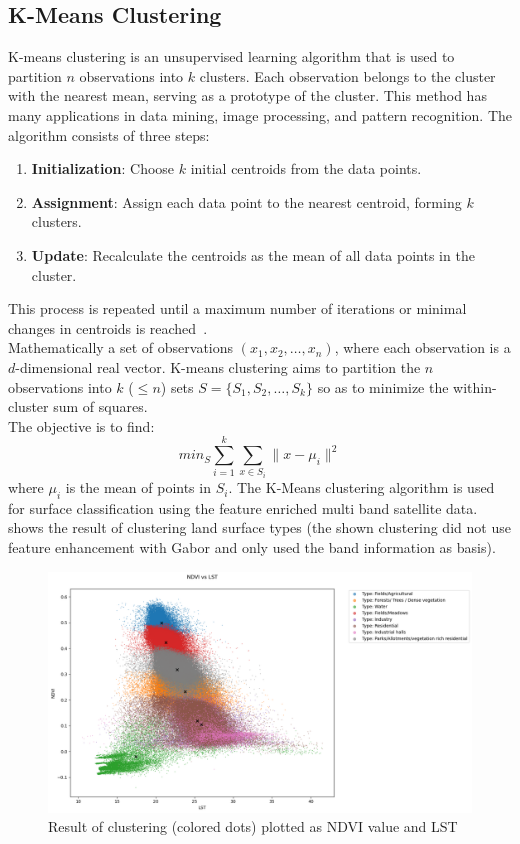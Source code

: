 \documentclass[12pt,a4paper, english,twoside]{article}
\begin{document}
%
\newpage
  \subsection{K-Means Clustering}\label{sec:kmeans}
    K-means clustering is an unsupervised learning algorithm that is used to partition $n$ observations into $k$ clusters. 
    Each observation belongs to the cluster with the nearest mean, serving as a prototype of the cluster. 
    This method has many applications in data mining, image processing, and pattern recognition.
    The algorithm consists of three steps:
    \begin{enumerate}
        \item \textbf{Initialization}: Choose $k$ initial centroids from the data points.
        \item \textbf{Assignment}: Assign each data point to the nearest centroid, forming $k$ clusters.
        \item \textbf{Update}: Recalculate the centroids as the mean of all data points in the cluster. 
    \end{enumerate}
    This process is repeated until a maximum number of iterations or minimal changes in centroids is reached~\cite{Sinaga2020}.\\ %
    Mathematically a set of observations $(x_1, x_2, \ldots, x_n)$, where each observation is a $d$-dimensional real vector.
    K-means clustering aims to partition the $n$ observations into $k$ ($\leq n$) sets $S = \{S_1, S_2, \ldots, S_k\}$ so as to minimize the within-cluster sum of squares. \\
    The objective is to find:
    \begin{equation}
        min_{S} \sum_{i=1}^{k} \sum_{x \in S_i} \| x - \mu_i \|^2
    \end{equation}
    where $\mu_i$ is the mean of points in $S_i$.
    The K-Means clustering algorithm is used for surface classification using the feature enriched multi band satellite data.
     shows the result of clustering land surface types (the shown clustering did not use feature enhancement with Gabor and only used the band information as basis).%
        \begin{figure}[!htbp]
          \centering
          \includegraphics[width=\textwidth]{img/NDVI vs LST.png}
          \caption{Result of clustering (colored dots) plotted as \gls{NDVI} value and \gls{LST}\label{fig:kmeansclusters}}
        \end{figure}
\end{document}

